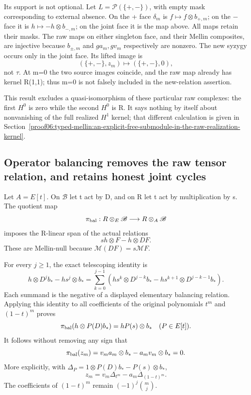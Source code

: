 \documentclass[10pt,a4paper,oneside]{report}
\begin{document}
Its support is not optional. Let \(L=\mathcal P(\{+,-\})\), with empty mask corresponding to external absence. On the + face \(\delta_m\) is \(f\mapsto f\otimes b_{+,m}\); on the \(-\) face it is \(h\mapsto-h\otimes b_{-,m}\); on the joint face it is the map above. All maps retain their masks. The raw maps on either singleton face, and their Mellin composites, are injective because \(b_{\pm,m}\) and \(ga_m,gv_m\) respectively are nonzero. The new syzygy occurs only in the joint face. Its lifted image is \[
(\{+,-\},z_m)\longmapsto(\{+,-\},0),
\] not \(\tau\). At m=0 the two source images coincide, and the raw map already has kernel R(1,1); thus m=0 is not falsely included in the new-relation assertion.

This result excludes a quasi-isomorphism of these particular raw complexes: the first \(H^0\) is zero while the second \(H^0\) is R. It says nothing by itself about nonvanishing of the full realized \(H^1\) kernel; that different calculation is given in Section~\ref{proof06:typed-mellin:an-explicit-free-submodule-in-the-raw-realization-kernel}.

\subsection{Operator balancing removes the raw tensor relation, and retains honest joint cycles}\label{proof06:typed-mellin:operator-balancing-removes-the-raw-tensor-relation-and-retains-honest-joint-cycles}

Let \(A=E[t]\). On \(\mathscr B\) let t act by D, and on R let t act by multiplication by s. The quotient map \[
\pi_{\rm bal}:R\otimes_E\mathscr B\longrightarrow R\otimes_A\mathscr B
\] imposes the R-linear span of the actual relations \[
sh\otimes F-h\otimes DF.
\] These are Mellin-null because \(\mathcal M(DF)=s\mathcal MF\).

For every \(j\ge1\), the exact telescoping identity is \[
h\otimes D^j b_*-hs^j\otimes b_*
=\sum_{k=0}^{j-1}
\left(hs^k\otimes D^{j-k}b_*
      -hs^{k+1}\otimes D^{j-k-1}b_*\right).
\] Each summand is the negative of a displayed elementary balancing relation. Applying this identity to all coefficients of the original polynomials \(t^m\) and \((1-t)^m\) proves \[
\pi_{\rm bal}(h\otimes P(D)b_*)=hP(s)\otimes b_*
\quad(P\in E[t]).
\] It follows without removing any sign that \[
\pi_{\rm bal}(z_m)
=v_ma_m\otimes b_*-a_mv_m\otimes b_*=0.
\] More explicitly, with \(\Delta_P=1\otimes P(D)b_*-P(s)\otimes b_*\), \[
z_m=v_m\Delta_{t^m}-a_m\Delta_{(1-t)^m}.
\] The coefficients of \((1-t)^m\) remain \((-1)^j\binom mj\).
\end{document}
